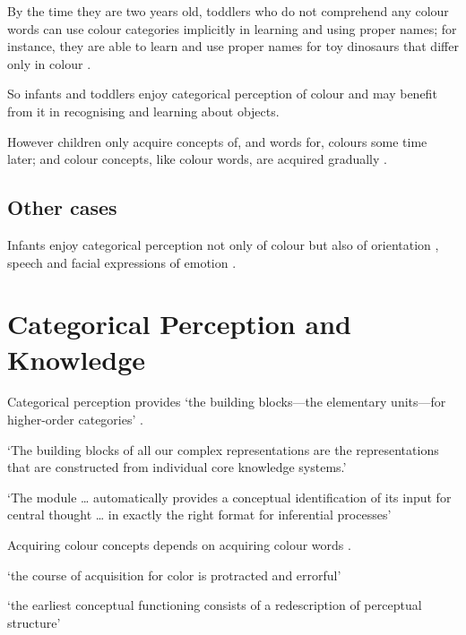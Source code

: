\documentclass[12pt]{extarticle}
\begin{document}
\begin{multicols}{3}
By the time they are two years old, toddlers who do not comprehend any colour words can use colour categories implicitly in learning and using proper names; for instance, they are able to learn and use proper names for toy dinosaurs that differ only in colour \citep[][Experiment 3]{Soja:1994np}.

So infants and toddlers enjoy categorical perception of colour and may benefit from it in recognising and learning about objects.

However children only acquire concepts of, and words for, colours some time later; and colour concepts, like colour words, are acquired gradually \citep{Pitchford:2005hm,Kowalski:2006hk,Sandhofer:1999if,Sandhofer:2006qo}.

\subsection{Other cases}

Infants enjoy categorical perception not only of colour but also of orientation \citep{franklin:2010_hemispheric}, speech \citep{Kuhl:1987la,Kuhl:2004nv,Jusczyk:1995it} and facial expressions of emotion \citep{Etcoff:1992zd,Kotsoni:2001ph,Campanella:2002aa}.



\section{Categorical Perception and Knowledge}

Categorical perception provides ‘the building blocks—the elementary units—for higher-order categories’
\citep[p.\ 3]{Harnad:1987ej}.

‘The building blocks of all our complex representations are the representations that are constructed from individual core knowledge systems.’
\citep[p.\ 307]{Spelke:2003fc}

‘The module  … automatically provides a conceptual identification of its input for central thought … in exactly the right format for inferential processes’
\citep[pp.\ 193--4]{Leslie:1988ct}

Acquiring colour concepts depends on acquiring colour words
\citep{Kowalski:2006hk}.

‘the course of acquisition for color is protracted and errorful’
\citep{Sandhofer:2006qo}

‘the earliest conceptual functioning consists of a redescription  of perceptual structure’
\citep{Mandler:1992vn}


\end{multicols}
\end{document}
